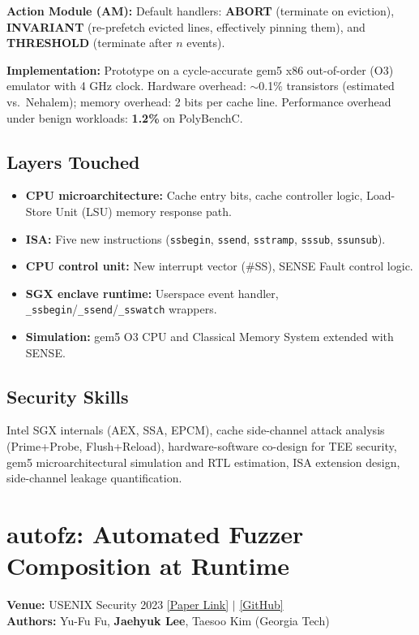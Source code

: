 \documentclass[11pt,letterpaper]{article}
\begin{document}
\textbf{Action Module (AM):}
Default handlers: \textbf{ABORT} (terminate on eviction), \textbf{INVARIANT} (re-prefetch evicted lines, effectively pinning them), and \textbf{THRESHOLD} (terminate after $n$ events).

\textbf{Implementation:} Prototype on a cycle-accurate gem5 x86 out-of-order (O3) emulator with 4 GHz clock.
Hardware overhead: $\sim$0.1\% transistors (estimated vs.\ Nehalem); memory overhead: 2 bits per cache line.
Performance overhead under benign workloads: \textbf{1.2\%} on PolyBenchC.

\subsection*{Layers Touched}
\begin{itemize}
    \item \textbf{CPU microarchitecture:} Cache entry bits, cache controller logic, Load-Store Unit (LSU) memory response path.
    \item \textbf{ISA:} Five new instructions (\texttt{ssbegin}, \texttt{ssend}, \texttt{sstramp}, \texttt{sssub}, \texttt{ssunsub}).
    \item \textbf{CPU control unit:} New interrupt vector (\#SS), SENSE Fault control logic.
    \item \textbf{SGX enclave runtime:} Userspace event handler, \texttt{\_ssbegin}/\texttt{\_ssend}/\texttt{\_sswatch} wrappers.
    \item \textbf{Simulation:} gem5 O3 CPU and Classical Memory System extended with SENSE.
\end{itemize}

\subsection*{Security Skills}
Intel SGX internals (AEX, SSA, EPCM), cache side-channel attack analysis (Prime+Probe, Flush+Reload), hardware-software co-design for TEE security, gem5 microarchitectural simulation and RTL estimation, ISA extension design, side-channel leakage quantification.

\newpage

\section{autofz: Automated Fuzzer Composition at Runtime}
\textbf{Venue:} USENIX Security 2023 \hfill
\href{https://www.usenix.org/system/files/sec23fall-prepub-446-fu.pdf}{[Paper Link]} $|$
\href{https://github.com/sslab-gatech/autofz}{[GitHub]}\\
\textbf{Authors:} Yu-Fu Fu, \textbf{Jaehyuk Lee}, Taesoo Kim (Georgia Tech)
\end{document}
